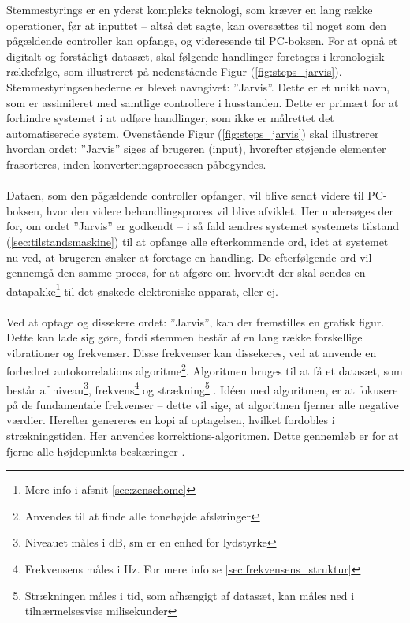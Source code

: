 Stemmestyrings er en yderst kompleks teknologi, som kræver en lang række operationer, før at inputtet – altså det sagte, kan oversættes til noget som den pågældende controller kan opfange, og videresende til PC-boksen. For at opnå et digitalt og forståeligt datasæt, skal følgende handlinger foretages i kronologisk rækkefølge, som illustreret på nedenstående Figur (\ref{fig:steps_jarvis}).  
Stemmestyringsenhederne er blevet navngivet: ”Jarvis”. Dette er et unikt navn, som er assimileret med samtlige controllere i husstanden. Dette er primært for at forhindre systemet i at udføre handlinger, som ikke er målrettet det automatiserede system. Ovenstående Figur (\ref{fig:steps_jarvis}) skal illustrerer hvordan ordet: ”Jarvis” siges af brugeren (input), hvorefter støjende elementer frasorteres, inden konverteringsprocessen påbegyndes. \\\\
Dataen, som den pågældende controller opfanger, vil blive sendt videre til PC-boksen, hvor den videre behandlingsproces vil blive afviklet. Her undersøges der for, om ordet ”Jarvis” er godkendt – i så fald ændres systemet systemets tilstand (\ref{sec:tilstandsmaskine}) til at opfange alle efterkommende ord, idet at systemet nu ved, at brugeren ønsker at foretage en handling. De efterfølgende ord vil gennemgå den samme proces, for at afgøre om hvorvidt der skal sendes en datapakke\footnote{Mere info i afsnit \ref{sec:zensehome}} til det ønskede elektroniske apparat, eller ej. \\\\
Ved at optage og dissekere ordet: ”Jarvis”, kan der fremstilles en grafisk figur. Dette kan lade sig gøre, fordi stemmen består af en lang række forskellige vibrationer og frekvenser. Disse frekvenser kan dissekeres, ved at anvende en forbedret autokorrelations algoritme\footnote{Anvendes til at finde alle tonehøjde afsløringer}. Algoritmen bruges til at få et datasæt, som består af niveau\footnote{Niveauet måles i dB, sm er en enhed for lydstyrke}, frekvens\footnote{Frekvensens måles i Hz. For mere info se \ref{sec:frekvensens_struktur}} og strækning\footnote{Strækningen måles i tid, som afhængigt af datasæt, kan måles ned i tilnærmelsesvise milisekunder} \cite{Autocorrelation}. Idéen med algoritmen, er at fokusere på de fundamentale frekvenser – dette vil sige, at algoritmen fjerner alle negative værdier. Herefter genereres en kopi af optagelsen, hvilket fordobles i strækningstiden. Her anvendes korrektions-algoritmen. Dette gennemløb er for at fjerne alle højdepunkts beskæringer \cite{Autocorrelation}.  \\
